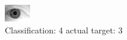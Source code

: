 \begin{figure}[h!]
\begin{center}
\includegraphics[width=0.60\columnwidth]{figures/ID2054_class_4_target_3.png}
\end{center}
\caption{ Classification: 4 actual target: 3}
\label{fig:ID2054_class_4_target_3}
\end{figure}
